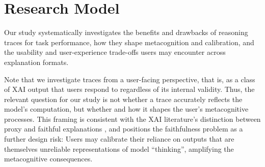 \documentclass[manuscript,review,anonymous]{acmart}
\begin{document}



\section{Research Model}

Our study systematically investigates the benefits and drawbacks of reasoning traces for task performance, how they shape metacognition and calibration, and the usability and user-experience trade-offs users may encounter across explanation formats.

Note that we investigate traces from a user-facing perspective, that is, as a class of XAI output that users respond to regardless of its internal validity. Thus, the relevant question for our study is not whether a trace accurately reflects the model's computation, but whether and how it shapes the user's metacognitive processes. This framing is consistent with the XAI literature's distinction between proxy and faithful explanations \cite{barez2025chain, jacovi-goldberg-2020-towards, 10.5555/3666122.3669397}, and positions the faithfulness problem as a further design risk: Users may calibrate their reliance on outputs that are themselves unreliable representations of model ``thinking'', amplifying the metacognitive consequences.
\end{document}

